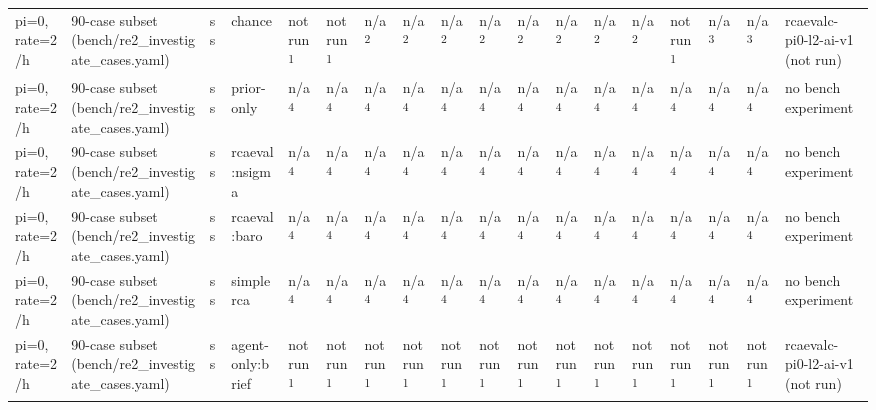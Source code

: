 \begin{table}[t]
\begin{tabular}{llllllllllllllllll}
pi=0, rate=2/h & 90-case subset (bench/re2\_investigate\_cases.yaml) & ss & chance & not run\textsuperscript{1} & not run\textsuperscript{1} & n/a\textsuperscript{2} & n/a\textsuperscript{2} & n/a\textsuperscript{2} & n/a\textsuperscript{2} & n/a\textsuperscript{2} & n/a\textsuperscript{2} & n/a\textsuperscript{2} & n/a\textsuperscript{2} & not run\textsuperscript{1} & n/a\textsuperscript{3} & n/a\textsuperscript{3} & rcaevalc-pi0-l2-ai-v1 (not run) \\
pi=0, rate=2/h & 90-case subset (bench/re2\_investigate\_cases.yaml) & ss & prior-only & n/a\textsuperscript{4} & n/a\textsuperscript{4} & n/a\textsuperscript{4} & n/a\textsuperscript{4} & n/a\textsuperscript{4} & n/a\textsuperscript{4} & n/a\textsuperscript{4} & n/a\textsuperscript{4} & n/a\textsuperscript{4} & n/a\textsuperscript{4} & n/a\textsuperscript{4} & n/a\textsuperscript{4} & n/a\textsuperscript{4} & no bench experiment \\
pi=0, rate=2/h & 90-case subset (bench/re2\_investigate\_cases.yaml) & ss & rcaeval:nsigma & n/a\textsuperscript{4} & n/a\textsuperscript{4} & n/a\textsuperscript{4} & n/a\textsuperscript{4} & n/a\textsuperscript{4} & n/a\textsuperscript{4} & n/a\textsuperscript{4} & n/a\textsuperscript{4} & n/a\textsuperscript{4} & n/a\textsuperscript{4} & n/a\textsuperscript{4} & n/a\textsuperscript{4} & n/a\textsuperscript{4} & no bench experiment \\
pi=0, rate=2/h & 90-case subset (bench/re2\_investigate\_cases.yaml) & ss & rcaeval:baro & n/a\textsuperscript{4} & n/a\textsuperscript{4} & n/a\textsuperscript{4} & n/a\textsuperscript{4} & n/a\textsuperscript{4} & n/a\textsuperscript{4} & n/a\textsuperscript{4} & n/a\textsuperscript{4} & n/a\textsuperscript{4} & n/a\textsuperscript{4} & n/a\textsuperscript{4} & n/a\textsuperscript{4} & n/a\textsuperscript{4} & no bench experiment \\
pi=0, rate=2/h & 90-case subset (bench/re2\_investigate\_cases.yaml) & ss & simplerca & n/a\textsuperscript{4} & n/a\textsuperscript{4} & n/a\textsuperscript{4} & n/a\textsuperscript{4} & n/a\textsuperscript{4} & n/a\textsuperscript{4} & n/a\textsuperscript{4} & n/a\textsuperscript{4} & n/a\textsuperscript{4} & n/a\textsuperscript{4} & n/a\textsuperscript{4} & n/a\textsuperscript{4} & n/a\textsuperscript{4} & no bench experiment \\
pi=0, rate=2/h & 90-case subset (bench/re2\_investigate\_cases.yaml) & ss & agent-only:brief & not run\textsuperscript{1} & not run\textsuperscript{1} & not run\textsuperscript{1} & not run\textsuperscript{1} & not run\textsuperscript{1} & not run\textsuperscript{1} & not run\textsuperscript{1} & not run\textsuperscript{1} & not run\textsuperscript{1} & not run\textsuperscript{1} & not run\textsuperscript{1} & not run\textsuperscript{1} & not run\textsuperscript{1} & rcaevalc-pi0-l2-ai-v1 (not run) \\

\end{tabular}
\end{table}

